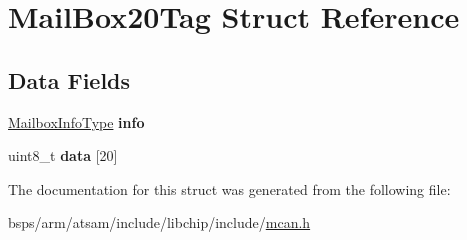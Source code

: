 \hypertarget{structMailBox20Tag}{}\section{Mail\+Box20\+Tag Struct Reference}
\label{structMailBox20Tag}
\subsection*{Data Fields}
\begin{DoxyCompactItemize}
\item 
\mbox{\label{structMailBox20Tag_ae235fada8db5e9d6b64bcb506e37c37e}} 
\mbox{\hyperlink{structMailboxInfoTag}{Mailbox\+Info\+Type}} {\bfseries info}
\item 
\mbox{\label{structMailBox20Tag_a797a4e65cd147a1b8ce755cf93c3ce96}} 
uint8\+\_\+t {\bfseries data} \mbox{[}20\mbox{]}
\end{DoxyCompactItemize}


The documentation for this struct was generated from the following file\+:\begin{DoxyCompactItemize}
\item 
bsps/arm/atsam/include/libchip/include/\mbox{\hyperlink{mcan_8h}{mcan.\+h}}\end{DoxyCompactItemize}
